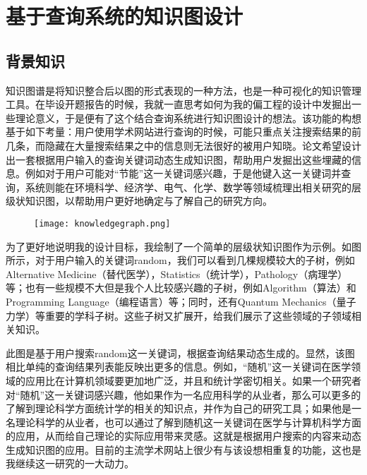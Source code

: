 
\chapter{基于查询系统的知识图设计}
\label{chap:c6}
\section{背景知识}
知识图谱是将知识整合后以图的形式表现的一种方法，也是一种可视化的知识管理工具。在毕设开题报告的时候，我就一直思考如何为我的偏工程的设计中发掘出一些理论意义，于是便有了这个结合查询系统进行知识图设计的想法。该功能的构想基于如下考量：用户使用学术网站进行查询的时候，可能只重点关注搜索结果的前几条，而隐藏在大量搜索结果之中的信息则无法很好的被用户知晓。论文希望设计出一套根据用户输入的查询关键词动态生成知识图，帮助用户发掘出这些埋藏的信息。例如对于用户可能对“节能”这一关键词感兴趣，于是他键入这一关键词并查询，系统则能在环境科学、经济学、电气、化学、数学等领域梳理出相关研究的层级状知识图，以帮助用户更好地确定与了解自己的研究方向。

\begin{figure}[!htp]
  \centering
  \texttt{[image: knowledgegraph.png]}
\end{figure}

为了更好地说明我的设计目标，我绘制了一个简单的层级状知识图作为示例。如图所示，对于用户输入的关键词random，我们可以看到几棵规模较大的子树，例如Alternative Medicine（替代医学），Statistics（统计学），Pathology（病理学）等；也有一些规模不大但是我个人比较感兴趣的子树，例如Algorithm（算法）和Programming Language（编程语言）等；同时，还有Quantum Mechanics（量子力学）等重要的学科子树。这些子树又扩展开，给我们展示了这些领域的子领域相关知识。

此图是基于用户搜索random这一关键词，根据查询结果动态生成的。显然，该图相比单纯的查询结果列表能反映出更多的信息。例如，“随机”这一关键词在医学领域的应用比在计算机领域要更加地广泛，并且和统计学密切相关。如果一个研究者对“随机”这一关键词感兴趣，他如果作为一名应用科学的从业者，那么可以更多的了解到理论科学方面统计学的相关的知识点，并作为自己的研究工具；如果他是一名理论科学的从业者，也可以通过了解到随机这一关键词在医学与计算机科学方面的应用，从而给自己理论的实际应用带来灵感。这就是根据用户搜索的内容来动态生成知识图的应用。目前的主流学术网站上很少有与该设想相重复的功能，这也是我继续这一研究的一大动力。

